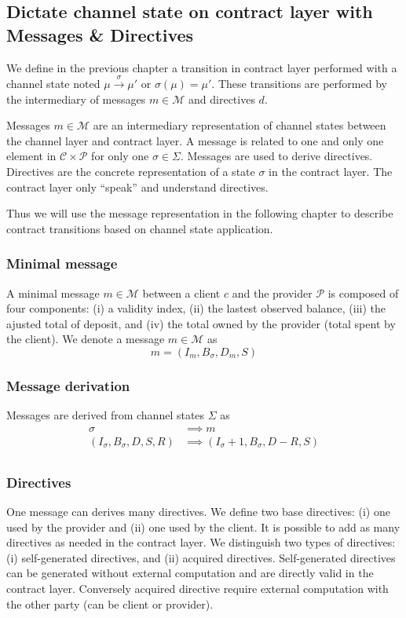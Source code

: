 \documentclass{llncs}
\begin{document}
\subsection{Dictate channel state on contract layer with Messages \& Directives} We define in the previous chapter a transition in contract layer performed with a channel state noted $\mu \xrightarrow{\sigma} \mu'$ or $\sigma(\mu) = \mu'$. These transitions are performed by the intermediary of messages $m \in \mathcal{M}$ and directives $d$.

Messages $m \in \mathcal{M}$ are an intermediary representation of channel states between the channel layer and contract layer. A message is related to one and only one element in $\mathcal{C} \times \mathcal{P}$ for only one $\sigma \in \Sigma$. Messages are used to derive directives. Directives are the concrete representation of a state $\sigma$ in the contract layer. The contract layer only ``speak'' and understand directives.

Thus we will use the message representation in the following chapter to describe contract transitions based on channel state application.

\subsubsection{Minimal message} A minimal message $m \in \mathcal{M}$ between a client $c$ and the provider $\mathcal{P}$ is composed of four components: (i) a validity index, (ii) the lastest observed balance, (iii) the ajusted total of deposit, and (iv) the total owned by the provider (total spent by the client). We denote a message $m \in \mathcal{M}$ as
$$m = (I_m, B_\sigma, D_m, S)$$

\subsubsection{Message derivation} Messages are derived from channel states $\Sigma$ as
\begin{equation*}
\begin{split}
    \sigma &\implies m \\
    (I_\sigma, B_\sigma, D, S, R) &\implies (I_\sigma +1, B_\sigma, D-R, S) \\
\end{split}
\end{equation*}

\subsubsection{Directives} One message can derives many directives. We define two base directives: (i) one used by the provider and (ii) one used by the client. It is possible to add as many directives as needed in the contract layer. We distinguish two types of directives: (i) self-generated directives, and (ii) acquired directives. Self-generated directives can be generated without external computation and are directly valid in the contract layer. Conversely acquired directive require external computation with the other party (can be client or provider).
\end{document}
